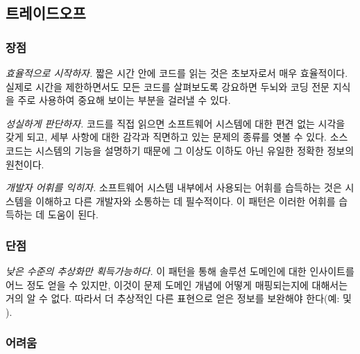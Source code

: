 \documentclass[a4paper,10pt,twoside]{book}
\begin{document}
\subsection*{트레이드오프}

\subsubsection*{장점}
\begin{bulletlist}
  \item \emph{효율적으로 시작하자.}
짧은 시간 안에 코드를 읽는 것은 초보자로서 매우 효율적이다. 실제로 시간을 제한하면서도 모든 코드를 살펴보도록 강요하면 두뇌와 코딩 전문 지식을 주로 사용하여 중요해 보이는 부분을 걸러낼 수 있다.

  \item \emph{성실하게 판단하자.}
코드를 직접 읽으면 소프트웨어 시스템에 대한 편견 없는 시각을 갖게 되고, 세부 사항에 대한 감각과 직면하고 있는 문제의 종류를 엿볼 수 있다. 소스 코드는 시스템의 기능을 설명하기 때문에 그 이상도 이하도 아닌 유일한 정확한 정보의 원천이다.

  \item \emph{개발자 어휘를 익히자.}
소프트웨어 시스템 내부에서 사용되는 어휘를 습득하는 것은 시스템을 이해하고 다른 개발자와 소통하는 데 필수적이다. 이 패턴은 이러한 어휘를 습득하는 데 도움이 된다.

\end{bulletlist}

\subsubsection*{단점}
\begin{bulletlist}
  \item \emph{낮은 수준의 추상화만 획득가능하다.}
이 패턴을 통해 솔루션 도메인에 대한 인사이트를 어느 정도 얻을 수 있지만, 이것이 문제 도메인 개념에 어떻게 매핑되는지에 대해서는 거의 알 수 없다. 따라서 더 추상적인 다른 표현으로 얻은 정보를 보완해야 한다(예:  및 ).
\end{bulletlist}

\subsubsection*{어려움}
\end{document}

